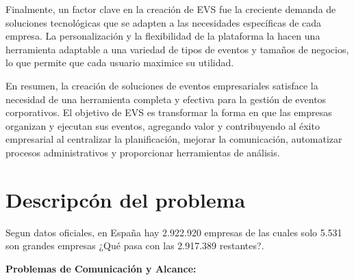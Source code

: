 Finalmente, un factor clave en la creación de EVS fue la creciente demanda de soluciones tecnológicas que se adapten a las 
necesidades específicas de cada empresa. La personalización y la flexibilidad de la plataforma la hacen una herramienta adaptable a 
una variedad de tipos de eventos y tamaños de negocios, lo que permite que cada usuario maximice su utilidad.

En resumen, la creación de soluciones de eventos empresariales satisface la necesidad de una herramienta completa y efectiva para la 
gestión de eventos corporativos. El objetivo de EVS es transformar la forma en que las empresas organizan y ejecutan sus eventos, agregando valor y 
contribuyendo al éxito empresarial al centralizar la planificación, mejorar la comunicación, automatizar procesos administrativos y proporcionar 
herramientas de análisis.

\section{Descripcón del problema}
Segun datos oficiales, en España hay 2.922.920 empresas de las cuales solo  5.531 son grandes empresas \cite{pymes} ¿Qué pasa con las 2.917.389 restantes?.

\textbf{Problemas de Comunicación y Alcance:}

